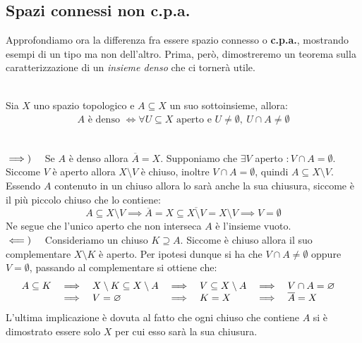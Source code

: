 \subsection{Spazi connessi non c.p.a.}
Approfondiamo ora la differenza fra essere spazio connesso o \textbf{c.p.a.}, mostrando esempi di un tipo ma non dell'altro. Prima, però, dimostreremo un teorema sulla caratterizzazione di un \textit{insieme denso} che ci tornerà utile.
\begin{theorema}~{}\\
	Sia $X$ uno spazio topologico e $A\subseteq X$ un suo sottoinsieme, allora:
		\begin{gather*}
			A \text{ è denso }\iff \forall U\subseteq X \text{ aperto e }U\neq\emptyset, \ U\cap A\neq\emptyset	
		\end{gather*}
	\vspace{-6mm}
\end{theorema}
\begin{demonstration}~{}\\
	$\implies)\quad$ Se $A$ è denso allora $\overline{A}=X$. Supponiamo che $\exists V$ aperto $\colon V\cap A=\emptyset$. Siccome $V$ è aperto allora $X\setminus V$ è chiuso, inoltre $V\cap A=\emptyset$, quindi $A\subseteq X\setminus V$. Essendo $A$ contenuto in un chiuso allora lo sarà anche la sua chiusura, siccome è il più piccolo chiuso che lo contiene:
		\begin{equation*}
			A\subseteq X\setminus V \implies \overline{A}=X\subseteq \overline{X\setminus V}=X\setminus V \implies V=\emptyset
		\end{equation*}
	Ne segue che l'unico aperto che non interseca $A$ è l'insieme vuoto. \\
	$\impliedby)\quad$ Consideriamo un chiuso $K\supseteq A$. Siccome è chiuso allora il suo complementare $X\setminus K$ è aperto. Per ipotesi dunque si ha che $V\cap A\neq \emptyset$ oppure $V=\emptyset$, passando al complementare si ottiene che:
	\vspace{-1mm}
		\begin{equation*}
			\begin{array}{llllllll}
				A\subseteq K &\implies& X\setminus K \subseteq X\setminus A &\implies& V\subseteq X\setminus A &\implies& V\cap A=\emptyset&\\
				& \implies& V=\emptyset& \implies& K=X& \implies & \overline{A}=X&
			\end{array}
		\vspace{-2mm}
		\end{equation*}
	L'ultima implicazione è dovuta al fatto che ogni chiuso che contiene $A$ si è dimostrato essere solo $X$ per cui esso sarà la sua chiusura.
\end{demonstration}

